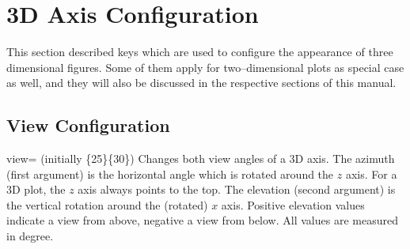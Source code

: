 

\section{3D Axis Configuration}
{
%
This section described keys which are used to configure the appearance of three dimensional figures. Some of them apply for two--dimensional plots as special case as well, and they will also be discussed in the respective sections of this manual.

\subsection{View Configuration}
\begin{pgfplotskey}{view= (initially \{25\}\{30\})}
	Changes both view angles of a 3D axis. The azimuth (first argument) is the horizontal angle which is rotated around the $z$ axis. For a 3D plot, the $z$ axis always points to the top. The elevation (second argument) is the vertical rotation around the (rotated) $x$ axis. Positive elevation values indicate a view from above, negative a view from below. All values are measured in degree.

\pgfplotsexpensiveexample
\begin{codeexample}[]
\end{codeexample}

\pgfplotsexpensiveexample
\begin{codeexample}[]
\end{codeexample}

\pgfplotsexpensiveexample
\begin{codeexample}[]
\end{codeexample}


\end{pgfplotskey}}
